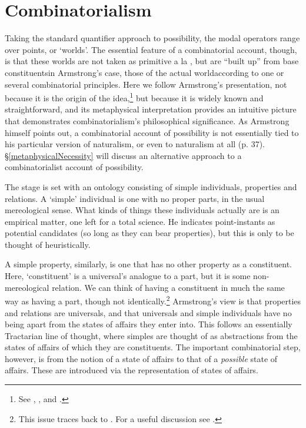 \section{Combinatorialism}\label{combinatorialism}

Taking the standard quantifier approach to possibility, the modal operators range over points, or `worlds'. The essential feature of a combinatorial account, though, is that these worlds are not taken as primitive a la \cite{Lewis1973}, but are ``built up'' from base constituents\textemdash in Armstrong's case, those of the actual world\textemdash according to one or several combinatorial principles. Here we follow Armstrong's \citeyear{Armstrong:89} presentation, not because it is the origin of the idea,\footnote{See \cite{Wittgenstein:61}, \cite{Cresswell:79}, and \cite{Skyrms:81}.} but because it is widely known and straightforward, and its metaphysical interpretation provides an intuitive picture that demonstrates combinatorialism's philosophical significance. As Armstrong himself points out, a combinatorial account of possibility is not essentially tied to his particular version of naturalism, or even to naturalism at all (p. 37). \S\ref{metaphysicalNecessity} will discuss an alternative approach to a combinatorialist account of possibility.  

The stage is set with an ontology consisting of simple individuals, properties and relations. A `simple' individual is one with no proper parts, in the usual mereological sense. What kinds of things these individuals actually are is an empirical matter, one left for a total science. He indicates point-instants as potential candidates (so long as they can bear properties), but this is only to be thought of heuristically. 

A simple property, similarly, is one that has no other property as a constituent. Here, `constituent' is a universal's analogue to a part, but it is some non-mereological relation. We can think of having a constituent in much the same way as having a part, though not identically.\footnote{This issue traces back to \cite{Leonard1930}. For a useful discussion see \cite{Rossberg2009}.} Armstrong's view is that properties and relations are universals, and that universals and simple individuals have no being apart from the states of affairs they enter into. This follows an essentially Tractarian line of thought, where simples are thought of as abstractions from the states of affairs of which they are constituents. The important combinatorial step, however, is from the notion of a state of affairs to that of a \emph{possible} state of affairs. These are introduced via the representation of states of affairs. 

